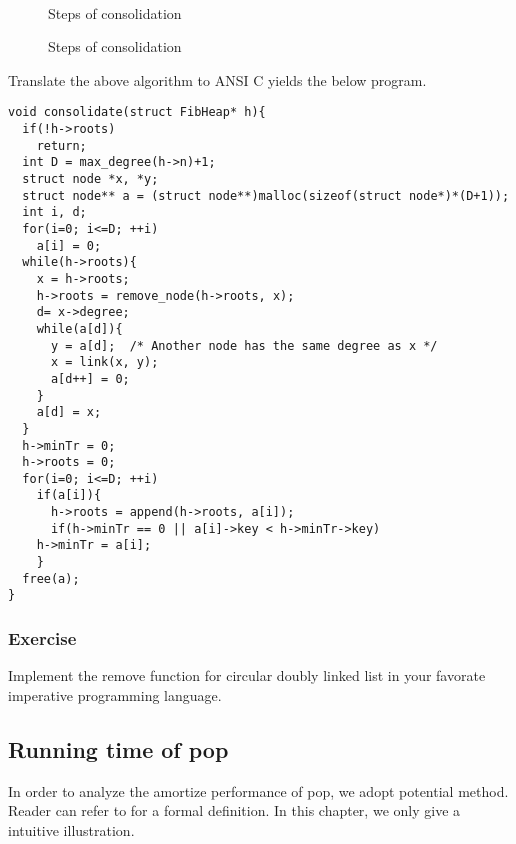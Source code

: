 \documentclass{article}
\begin{document}
\begin{figure}[htbp]
  \centering
   \\
  \caption{Steps of consolidation} \label{fig:fib-cons-b}
\end{figure}

\begin{figure}[htbp]
  \centering
  \caption{Steps of consolidation} \label{fig:fib-cons-c}
\end{figure}


Translate the above algorithm to ANSI C yields the below program.

\lstset{language = C}
\begin{lstlisting}
void consolidate(struct FibHeap* h){
  if(!h->roots)
    return;
  int D = max_degree(h->n)+1;
  struct node *x, *y;
  struct node** a = (struct node**)malloc(sizeof(struct node*)*(D+1));
  int i, d;
  for(i=0; i<=D; ++i)
    a[i] = 0;
  while(h->roots){
    x = h->roots;
    h->roots = remove_node(h->roots, x);
    d= x->degree;
    while(a[d]){ 
      y = a[d];  /* Another node has the same degree as x */
      x = link(x, y);
      a[d++] = 0;
    }
    a[d] = x;
  }
  h->minTr = 0;
  h->roots = 0;
  for(i=0; i<=D; ++i)
    if(a[i]){
      h->roots = append(h->roots, a[i]);
      if(h->minTr == 0 || a[i]->key < h->minTr->key)
	h->minTr = a[i];
    }
  free(a);
}
\end{lstlisting}

\subsubsection*{Exercise}
Implement the remove function for circular doubly linked list in your favorate
imperative programming language.

\subsection{Running time of pop}

In order to analyze the amortize performance of pop,
we adopt potential method. Reader can refer to \cite{CLRS} for a formal
definition. In this chapter, we only give a intuitive illustration.
\end{document}
